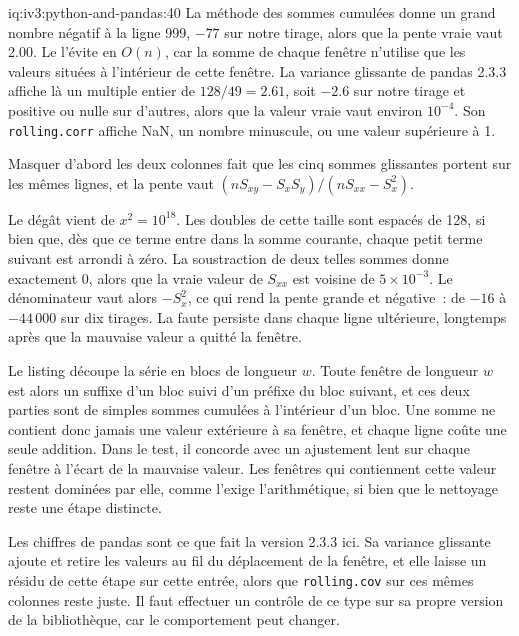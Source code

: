 \begin{solution}{iq:iv3:python-and-pandas:40}
La méthode des sommes cumulées donne un grand nombre négatif à la ligne 999, $-77$ sur notre tirage, alors que la pente vraie vaut 2.00. Le  l'évite en $O(n)$, car la somme de chaque fenêtre n'utilise que les valeurs situées à l'intérieur de cette fenêtre. La variance glissante de pandas 2.3.3 affiche là un multiple entier de $128/49 = 2.61$, soit $-2.6$ sur notre tirage et positive ou nulle sur d'autres, alors que la valeur vraie vaut environ $10^{-4}$. Son \texttt{rolling.corr} affiche NaN, un nombre minuscule, ou une valeur supérieure à 1.
\label{lst:iv3:pp:rollbeta}

Masquer d'abord les deux colonnes fait que les cinq sommes glissantes portent sur les mêmes lignes, et la pente vaut $(n S_{xy} - S_x S_y) / (n S_{xx} - S_x^2)$.

Le dégât vient de $x^2 = 10^{18}$. Les doubles de cette taille sont espacés de 128, si bien que, dès que ce terme entre dans la somme courante, chaque petit terme suivant est arrondi à zéro. La soustraction de deux telles sommes donne exactement 0, alors que la vraie valeur de $S_{xx}$ est voisine de $5 \times 10^{-3}$. Le dénominateur vaut alors $-S_x^2$, ce qui rend la pente grande et négative~: de $-16$ à $-44\,000$ sur dix tirages. La faute persiste dans chaque ligne ultérieure, longtemps après que la mauvaise valeur a quitté la fenêtre.

Le listing découpe la série en blocs de longueur $w$. Toute fenêtre de longueur $w$ est alors un suffixe d'un bloc suivi d'un préfixe du bloc suivant, et ces deux parties sont de simples sommes cumulées à l'intérieur d'un bloc. Une somme ne contient donc jamais une valeur extérieure à sa fenêtre, et chaque ligne coûte une seule addition. Dans le test, il concorde avec un ajustement lent sur chaque fenêtre à l'écart de la mauvaise valeur. Les fenêtres qui contiennent cette valeur restent dominées par elle, comme l'exige l'arithmétique, si bien que le nettoyage reste une étape distincte.

Les chiffres de pandas sont ce que fait la version 2.3.3 ici. Sa variance glissante ajoute et retire les valeurs au fil du déplacement de la fenêtre, et elle laisse un résidu de cette étape sur cette entrée, alors que \texttt{rolling.cov} sur ces mêmes colonnes reste juste. Il faut effectuer un contrôle de ce type sur sa propre version de la bibliothèque, car le comportement peut changer.

\end{solution}
